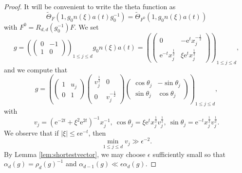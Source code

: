 \documentclass[10pt,a4paper]{amsart}
\newcommand{\e}{\mathrm{e}}
\begin{document}
\begin{proof}
It will be convenient to write the theta function as 
\begin{equation}
\widetilde\Theta_F(1, g_0 n(\xi) a(t) g_0^{-1}) =
\widetilde\Theta_{F^0}(1, g_0 n(\xi) a(t))
\end{equation}
with $F^0 = R_{d,d}(g_0^{-1}) F$.
We set 
\begin{equation}
  \label{eq:JgXM}
  g = \left(  \begin{pmatrix}   0 & -1 \\
    1 & 0 
  \end{pmatrix}
  \right)_{\!\!1\leq j\leq d}
  g_0  n(\xi) a(t)  = \left(  \begin{pmatrix}   0 & - \e^t x_j^{-\frac{1}{2}} \\
    \e^{-t} x_j^{\frac{1}{2}} & \xi \e^t x_j^{\frac{1}{2}}
  \end{pmatrix}
  \right)_{\!\!1\leq j\leq d},
\end{equation}
and we compute that
\begin{equation}
  \label{eq:gIwasawa}
  g = \left(  \begin{pmatrix}   1 & u_j \\
    0 & 1
  \end{pmatrix}
  \begin{pmatrix}
    v_j^{\frac{1}{2}} & 0 \\
    0 & v_j^{-\frac{1}{2}}
  \end{pmatrix}
  \begin{pmatrix}
    \cos \theta_j & -\sin \theta_j \\
    \sin \theta_j  & \cos \theta_j
  \end{pmatrix}
  \right)_{\!\!1\leq j\leq d},
\end{equation}
with
\begin{equation}
  \label{eq:YRS}
  v_j =  (\e^{-2t} + \xi^2\e^{2t})^{-1}  x_j^{-1},\ \cos \theta_j = \xi \e^t x_j^{\frac{1}{2}}v_j^{\frac{1}{2}},\  \sin \theta_j = \e^{-t} x_j^{\frac{1}{2}}v_j^{\frac{1}{2}}. 
\end{equation}
We observe that if $|\xi| \leq \epsilon \e^{-t}$, then
\begin{equation}
  \label{eq:vnGammang}
  \min_{1\leq j\leq d} v_j \gg \epsilon^{-2}.
\end{equation}
By Lemma \ref{lem:shortestvector}, we may choose $\epsilon$ sufficiently small so that $\alpha_d(g) = \rho_d(g)^{-1}$ and $\alpha_{d-1}(g) \ll \epsilon \alpha_d(g)$. 


\end{proof}
\end{document}
